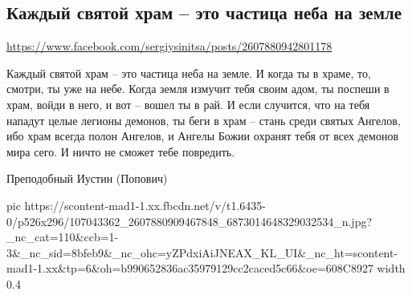  
 
 
 
 

\subsection{Каждый святой храм – это частица неба на земле}
\label{sec:03_06_2020.fb.sinitsa_sergej.1.hram}
\url{https://www.facebook.com/sergiysinitsa/posts/2607880942801178}

Каждый святой храм – это частица неба на земле. И когда ты в храме, то, смотри,
ты уже на небе. Когда земля измучит тебя своим адом, ты поспеши в храм, войди в
него, и вот – вошел ты в рай. И если случится, что на тебя нападут целые
легионы демонов, ты беги в храм – стань среди святых Ангелов, ибо храм всегда
полон Ангелов, и Ангелы Божии охранят тебя от всех демонов мира сего. И ничто
не сможет тебе повредить. 

Преподобный Иустин (Попович)

\ifcmt
  pic https://scontent-mad1-1.xx.fbcdn.net/v/t1.6435-0/p526x296/107043362_2607880909467848_6873014648329032534_n.jpg?_nc_cat=110&ccb=1-3&_nc_sid=8bfeb9&_nc_ohc=yZPdxiAiJNEAX_KL_UI&_nc_ht=scontent-mad1-1.xx&tp=6&oh=b990652836ac35979129cc2caced5c66&oe=608C8927
  width 0.4
\fi

